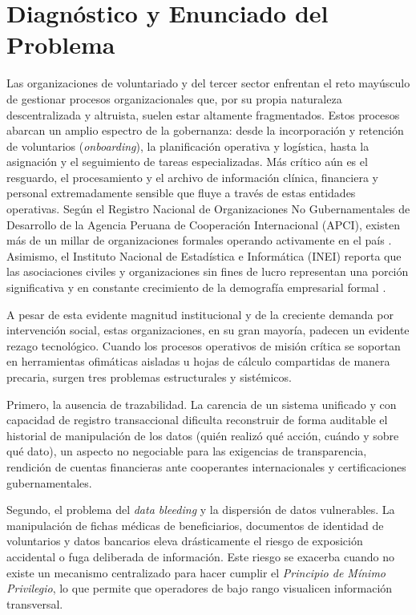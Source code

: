 \section{Diagnóstico y Enunciado del Problema}

Las organizaciones de voluntariado y del tercer sector enfrentan el reto mayúsculo de gestionar procesos organizacionales que, por su propia naturaleza descentralizada y altruista, suelen estar altamente fragmentados. Estos procesos abarcan un amplio espectro de la gobernanza: desde la incorporación y retención de voluntarios (\textit{onboarding}), la planificación operativa y logística, hasta la asignación y el seguimiento de tareas especializadas. Más crítico aún es el resguardo, el procesamiento y el archivo de información clínica, financiera y personal extremadamente sensible que fluye a través de estas entidades operativas. Según el Registro Nacional de Organizaciones No Gubernamentales de Desarrollo de la Agencia Peruana de Cooperación Internacional (APCI), existen más de un millar de organizaciones formales operando activamente en el país \citep{apci2024}. Asimismo, el Instituto Nacional de Estadística e Informática (INEI) reporta que las asociaciones civiles y organizaciones sin fines de lucro representan una porción significativa y en constante crecimiento de la demografía empresarial formal \citep{inei2024}.

A pesar de esta evidente magnitud institucional y de la creciente demanda por intervención social, estas organizaciones, en su gran mayoría, padecen un evidente rezago tecnológico. Cuando los procesos operativos de misión crítica se soportan en herramientas ofimáticas aisladas u hojas de cálculo compartidas de manera precaria, surgen tres problemas estructurales y sistémicos.

Primero, la ausencia de trazabilidad. La carencia de un sistema unificado y con capacidad de registro transaccional dificulta reconstruir de forma auditable el historial de manipulación de los datos (quién realizó qué acción, cuándo y sobre qué dato), un aspecto no negociable para las exigencias de transparencia, rendición de cuentas financieras ante cooperantes internacionales y certificaciones gubernamentales.

Segundo, el problema del \textit{data bleeding} y la dispersión de datos vulnerables. La manipulación de fichas médicas de beneficiarios, documentos de identidad de voluntarios y datos bancarios eleva drásticamente el riesgo de exposición accidental o fuga deliberada de información. Este riesgo se exacerba cuando no existe un mecanismo centralizado para hacer cumplir el \textit{Principio de Mínimo Privilegio}, lo que permite que operadores de bajo rango visualicen información transversal.


